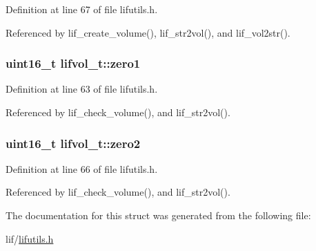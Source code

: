 Definition at line 67 of file lifutils.\+h.



Referenced by lif\+\_\+create\+\_\+volume(), lif\+\_\+str2vol(), and lif\+\_\+vol2str().

\subsubsection[{\texorpdfstring{zero1}{zero1}}]{\setlength{\rightskip}{0pt plus 5cm}uint16\+\_\+t lifvol\+\_\+t\+::zero1}\hypertarget{structlifvol__t_a5e749ae4bff79deaa813966cff04f431}{}\label{structlifvol__t_a5e749ae4bff79deaa813966cff04f431}


Definition at line 63 of file lifutils.\+h.



Referenced by lif\+\_\+check\+\_\+volume(), and lif\+\_\+str2vol().

\subsubsection[{\texorpdfstring{zero2}{zero2}}]{\setlength{\rightskip}{0pt plus 5cm}uint16\+\_\+t lifvol\+\_\+t\+::zero2}\hypertarget{structlifvol__t_ac05fef8e2c908110de7083d7afbfdb37}{}\label{structlifvol__t_ac05fef8e2c908110de7083d7afbfdb37}


Definition at line 66 of file lifutils.\+h.



Referenced by lif\+\_\+check\+\_\+volume(), and lif\+\_\+str2vol().



The documentation for this struct was generated from the following file\+:\begin{DoxyCompactItemize}
\item 
lif/\hyperlink{lifutils_8h}{lifutils.\+h}\end{DoxyCompactItemize}
